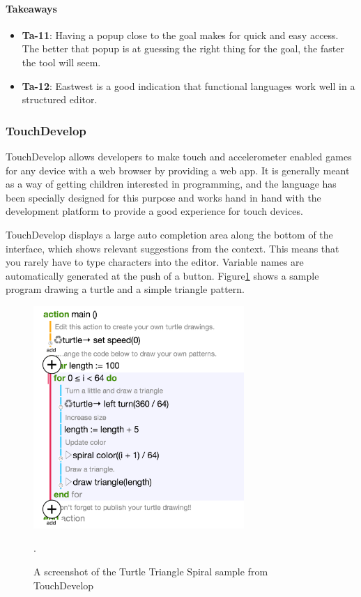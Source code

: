 \paragraph{Takeaways}
\begin{itemize}
	\item \textbf{Ta-11}: Having a popup close to the goal makes for quick and easy access. The better that popup is at guessing the right thing for the goal, the faster the tool will seem.
	\item \textbf{Ta-12}: Eastwest is a good indication that functional languages work well in a structured editor.
\end{itemize}


\subsubsection{TouchDevelop}
\label{subsub:TouchDevelop}
TouchDevelop allows developers to make touch and accelerometer enabled games for any device with a web browser by providing a web app. It is generally meant as a way of getting children interested in programming, and the language has been specially designed for this purpose and works hand in hand with the development platform to provide a good experience for touch devices.

TouchDevelop displays a large auto completion area along the bottom of the interface, which shows relevant suggestions from the context. 
This means that you rarely have to type characters into the editor. 
Variable names are automatically generated at the push of a button.
Figure\ref{fig:TouchDevelop_screenshot} shows a sample program drawing a
turtle and a simple triangle pattern.

\begin{figure}
	\centering
		\includegraphics[width=80mm]{diagrams/TouchDevelop_screenshot.png}
	\caption{A screenshot of the Turtle Triangle Spiral sample from
	TouchDevelop\,\cite{TouchDevelop:TurtleTriangleSpiral}}.
\label{fig:TouchDevelop_screenshot}
\end{figure}

